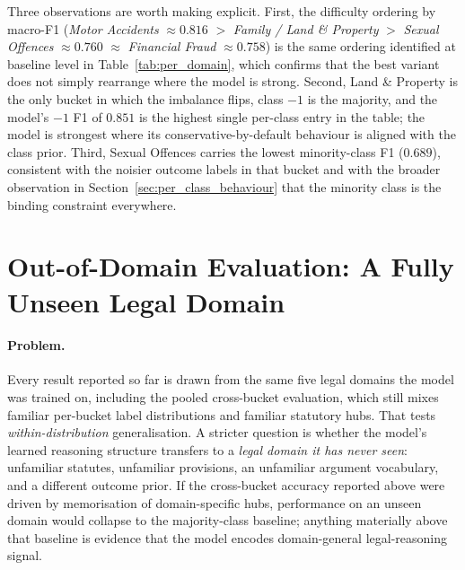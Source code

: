 Three observations are worth making explicit. First, the
difficulty ordering by macro-F1 (\textit{Motor Accidents}
$\approx 0.816$ $>$ \textit{Family / Land \& Property} $>$
\textit{Sexual Offences} $\approx 0.760$ $\approx$
\textit{Financial Fraud} $\approx 0.758$) is the same ordering
identified at baseline level in
Table~\ref{tab:per_domain}, which confirms that the best variant
does not simply rearrange where the model is strong. Second, Land
\& Property is the only bucket in which the imbalance flips,
class $-1$ is the majority, and the model's $-1$ F1 of $0.851$ is
the highest single per-class entry in the table; the model is
strongest where its conservative-by-default behaviour is aligned
with the class prior. Third, Sexual Offences carries the lowest
minority-class F1 ($0.689$), consistent with the noisier outcome
labels in that bucket and with the broader observation in
Section~\ref{sec:per_class_behaviour} that the minority class is the
binding constraint everywhere.

%

\section{Out-of-Domain Evaluation: A Fully Unseen Legal Domain}
\label{sec:cross_domain_food_safety}

\paragraph{Problem.}
Every result reported so far is drawn from the same five legal
domains the model was trained on, including the pooled
cross-bucket evaluation, which still mixes familiar per-bucket label
distributions and familiar statutory hubs. That tests
\emph{within-distribution} generalisation. A stricter question is
whether the model's learned reasoning structure transfers to a
\emph{legal domain it has never seen}: unfamiliar statutes,
unfamiliar provisions, an unfamiliar argument vocabulary, and a
different outcome prior. If the cross-bucket accuracy reported above
were driven by memorisation of domain-specific hubs, performance on
an unseen domain would collapse to the majority-class baseline;
anything materially above that baseline is evidence that the model
encodes domain-general legal-reasoning signal.


